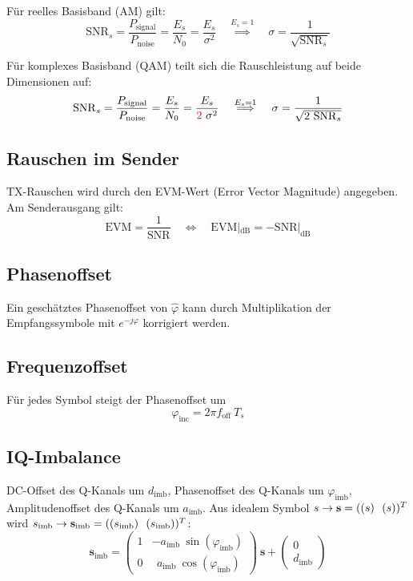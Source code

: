 \documentclass[a4paper, 11pt]{article}
\let\Re\relax
\let\Im\relax
\DeclareMathOperator{\Re}{Re}
\DeclareMathOperator{\Im}{Im}
\begin{document}
Für reelles Basisband (AM) gilt:
\[
	\mathrm{SNR}_s = \frac{P_\mathrm{signal}}{P_\mathrm{noise}} = \frac{E_s}{N_0} = \frac{E_s}{\sigma^2} \quad \overset{E_s = 1}{\implies} \quad \sigma = \frac{1}{\sqrt{\mathrm{SNR}_s}}
\]

Für komplexes Basisband (QAM) teilt sich die Rauschleistung auf beide Dimensionen auf:
\[
	\mathrm{SNR}_s = \frac{P_\mathrm{signal}}{P_\mathrm{noise}} = \frac{E_s}{N_0} = \frac{E_s}{{\color{red} 2} ~ \sigma^2} \quad \overset{E_s = 1}{\implies} \quad \sigma = \frac{1}{\sqrt{2 ~ \mathrm{SNR}_s}}
\]

\subsection*{Rauschen im Sender}
TX-Rauschen wird durch den EVM-Wert (Error Vector Magnitude) angegeben. Am Senderausgang gilt:
\[
	\mathrm{EVM} = \frac{1}{\mathrm{SNR}} \quad \Leftrightarrow \quad \mathrm{EVM}|_{\mathrm{dB}} = - \mathrm{SNR}|_{\mathrm{dB}}
\]

\subsection*{Phasenoffset}
Ein geschätztes Phasenoffset von $\hat \varphi$ kann durch Multiplikation der Empfangssymbole mit $e^{-j \varphi}$ korrigiert werden.

\subsection*{Frequenzoffset}
Für jedes Symbol steigt der Phasenoffset um
\[
	\varphi_{\mathrm{inc}} = 2 \pi f_{\mathrm{off}} ~ T_s
\]

\subsection*{IQ-Imbalance}
DC-Offset des Q-Kanals um $d_{\mathrm{imb}}$, Phasenoffset des Q-Kanals um $\varphi_{\mathrm{imb}}$, Amplitudenoffset des Q-Kanals um $a_{\mathrm{imb}}$. Aus idealem Symbol $s \rightarrow \mathbf s = (\Re(s) ~~ \Im(s))^T$ wird $s_{\mathrm{imb}} \rightarrow \mathbf s_{\mathrm{imb}} = (\Re(s_{\mathrm{imb}}) ~~ \Im(s_{\mathrm{imb}}))^T$:
\[
	\mathbf s_{\mathrm{imb}} = \begin{pmatrix}
		1 & -a_\mathrm{imb} ~ \sin(\varphi_\mathrm{imb}) \\
		0 & ~~ a_\mathrm{imb} ~ \cos(\varphi_\mathrm{imb})
	\end{pmatrix} ~ \mathbf s + \begin{pmatrix}
		0 \\
		d_\mathrm{imb}
	\end{pmatrix}
\]
\end{document}
